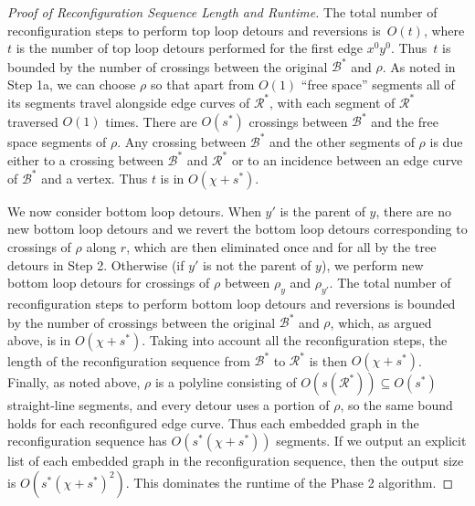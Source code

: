 \documentclass[a4paper,USenglish,cleveref,colorlinks=true,urlcolor=black,linkcolor=black,citecolor=black,thm-restate,authorcolumns]{lipics-v2021}
\theoremstyle{claimstyle}
\begin{document}
\begin{proof}[Proof of Reconfiguration Sequence Length and Runtime]
    The total number of reconfiguration steps to perform top loop detours and reversions is~$O(t)$, where $t$ is
    the number of top loop detours performed for the first edge $x^0 y^0$.
    Thus~$t$ is bounded by the number of crossings between the original $\mathcal B^*$ and $\rho$.
    As noted in Step 1a, we can choose $\rho$ so that apart from $O(1)$ \enquote{free space} segments all of its segments
    travel alongside edge curves of ${\mathcal R}^*$, with each segment of ${\mathcal R}^*$ traversed $O(1)$ times.
    There are $O(s^*)$ crossings between $\mathcal B^*$ and the free space segments of $\rho$.
    Any crossing between $\mathcal B^*$ and the other segments of $\rho$ is due either to a crossing between $\mathcal B^*$ and ${\mathcal R}^*$ or to
    an incidence between an edge curve of
    $\mathcal B^*$ and a vertex.
    Thus $t$ is in $O(\chi + s^*)$.

    We now consider bottom loop detours.
    When $y'$ is the parent of $y$, there are no new bottom loop detours and we revert the bottom loop detours corresponding to crossings of $\rho$ along $r$, which are then eliminated once and for all by the tree detours in Step 2.
    Otherwise (if $y'$ is not the parent of $y$),
    we perform new bottom loop detours for crossings of $\rho$ between $\rho_y$ and $\rho_{y'}$.
    The total number of reconfiguration steps to perform bottom loop detours and reversions is bounded by the number of crossings
    between the original
    $\mathcal B^*$ and $\rho$, which, as argued above, is in
    $O(\chi + s^*)$.
    Taking into account all the reconfiguration steps, the length of the reconfiguration sequence from $\mathcal B^*$ to $\mathcal R^*$ is then $O(\chi + s^*)$.
    Finally, as noted above, $\rho$ is a polyline consisting of
    $O(s({\mathcal R}^*))\subseteq O(s^*)$ straight-line segments, and every detour uses a portion of $\rho$, so the same bound holds for each reconfigured edge curve.
    Thus each embedded graph in the reconfiguration sequence has $O(s^*(\chi+s^*))$
    segments.
    If we output an explicit list of each embedded graph in the reconfiguration sequence, then the output size is
    $O(s^*(\chi + s^*)^2)$.
    This dominates the runtime of the Phase 2 algorithm.
\end{proof}



\forestlemma*
\label{Pforestlemma}
\end{document}
